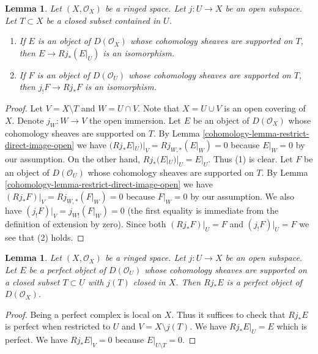 \documentclass{amsart}
\theoremstyle{plain}
\newtheorem{lemma}[subsection]{Lemma}
\theoremstyle{definition}
\theoremstyle{remark}
\numberwithin{equation}{subsection}
\begin{document}
\begin{lemma}
\label{cohomology-lemma-pushforward-restriction}
Let $(X, \mathcal{O}_X)$ be a ringed space. Let $j : U \to X$ be an
open subspace. Let $T \subset X$ be a closed subset contained in $U$.
\begin{enumerate}
\item If $E$ is an object of $D(\mathcal{O}_X)$ whose cohomology sheaves
are supported on $T$, then $E \to Rj_*(E|_U)$ is an isomorphism.
\item If $F$ is an object of $D(\mathcal{O}_U)$ whose cohomology sheaves
are supported on $T$, then $j_!F \to Rj_*F$ is an isomorphism.
\end{enumerate}
\end{lemma}

\begin{proof}
Let $V = X \setminus T$ and $W = U \cap V$. Note that $X = U \cup V$ is an
open covering of $X$. Denote $j_W : W \to V$ the open immersion.
Let $E$ be an object of $D(\mathcal{O}_X)$ whose cohomology sheaves are
supported on $T$. By
Lemma \ref{cohomology-lemma-restrict-direct-image-open} we have
$(Rj_*E|_U)|_V = Rj_{W, *}(E|_W) = 0$ because $E|_W = 0$ by our assumption.
On the other hand, $Rj_*(E|_U)|_U = E|_U$. Thus (1) is clear.
Let $F$ be an object of $D(\mathcal{O}_U)$ whose cohomology sheaves
are supported on $T$. By
Lemma \ref{cohomology-lemma-restrict-direct-image-open} we have
$(Rj_*F)|_V = Rj_{W, *}(F|_W) = 0$ because $F|_W = 0$ by our assumption.
We also have $(j_!F)|_V = j_{W!}(F|_W) = 0$ (the first equality is immediate
from the definition of extension by zero). Since both
$(Rj_*F)|_U = F$ and $(j_!F)|_U = F$ we see that (2) holds.
\end{proof}


\begin{lemma}
\label{cohomology-lemma-pushforward-perfect}
Let $(X, \mathcal{O}_X)$ be a ringed space. Let $j : U \to X$ be an
open subspace. Let $E$ be a perfect object of $D(\mathcal{O}_U)$
whose cohomology
sheaves are supported on a closed subset $T \subset U$ with $j(T)$
closed in $X$. Then $Rj_*E$ is a perfect object of $D(\mathcal{O}_X)$.
\end{lemma}

\begin{proof}
Being a perfect complex is local on $X$. Thus it suffices to check that
$Rj_*E$ is perfect when restricted to $U$ and $V = X \setminus j(T)$.
We have $Rj_*E|_U = E$ which is perfect. We have
 $Rj_*E|_V = 0$ because $E|_{U \setminus T} = 0$.
\end{proof}
\end{document}
